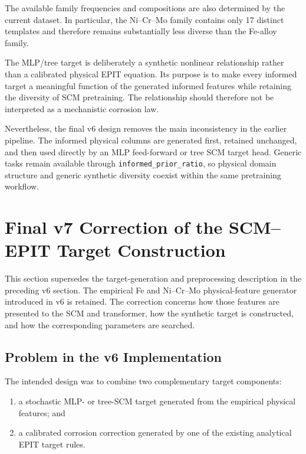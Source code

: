 \documentclass{article}
\begin{document}
The available family frequencies and compositions are also determined by the
current dataset. In particular, the Ni--Cr--Mo family contains only 17 distinct
templates and therefore remains substantially less diverse than the Fe-alloy
family.

The MLP/tree target is deliberately a synthetic nonlinear relationship rather
than a calibrated physical EPIT equation. Its purpose is to make every informed
target a meaningful function of the generated informed features while
retaining the diversity of SCM pretraining. The relationship should therefore
not be interpreted as a mechanistic corrosion law.

Nevertheless, the final v6 design removes the main inconsistency in the earlier
pipeline. The informed physical columns are generated first, retained
unchanged, and then used directly by an MLP feed-forward or tree SCM target
head. Generic tasks remain available through
\texttt{informed\_prior\_ratio}, so physical domain structure and generic
synthetic diversity coexist within the same pretraining workflow.



\section{Final v7 Correction of the SCM--EPIT Target Construction}
\label{sec:final-v7-scm-epit-correction}

This section supersedes the target-generation and preprocessing description in
the preceding v6 section. The empirical Fe and Ni--Cr--Mo physical-feature
generator introduced in v6 is retained. The correction concerns how those
features are presented to the SCM and transformer, how the synthetic target is
constructed, and how the corresponding parameters are searched.

\subsection{Problem in the v6 Implementation}

The intended design was to combine two complementary target components:

\begin{enumerate}
    \item a stochastic MLP- or tree-SCM target generated from the empirical
    physical features; and
    \item a calibrated corrosion correction generated by one of the existing
    analytical EPIT target rules.
\end{enumerate}
\end{document}
